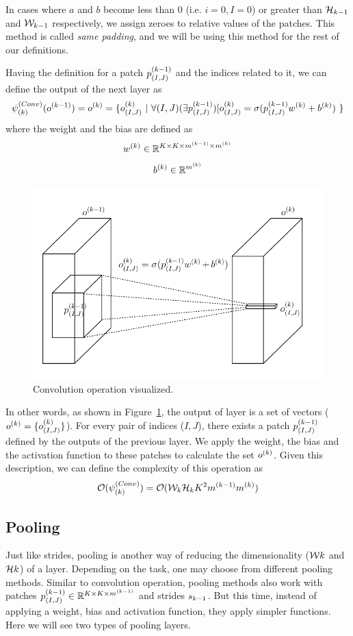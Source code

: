 In cases where $a$ and $b$ become less than 0 (i.e. $i=0, I=0$) or greater than $\mathcal{H}_{k-1}$ and $\mathcal{W}_{k-1}$ respectively, we assign zeroes to relative values of the patches. This method is called \textit{same padding}, and we will be using this method for the rest of our definitions. 

Having the definition for a patch $p^{(k-1)}_{(I,J)}$ and the indices related to it, we can define the output of the next layer as
$$\convk{k}(\ok{k-1}) = \ok{k} = \{\oki{k}{(I,J)} \ | \ \forall (I,J) (\exists \pki{k-1}{(I,J)}) [ \oki{k}{(I,J)} = \sigma(\pki{k-1}{(I,J)} \wk{k} + \bk{k})\ \}  $$
where the weight and the bias are defined as
$$ w^{(k)} \in \mathbb{R}^{K \times K \times m^{(k-1)} \times m^{(k)}} $$
$$ b^{(k)} \in \mathbb{R}^{m^{(k)}}$$
\begin{figure}[!h]
  \begin{centering}
    \includegraphics[width=1\textwidth]{images/convolution.pdf}
    \caption{Convolution operation visualized. }
    \label{fig:convolution}
  \end{centering}
\end{figure}
In other words, as shown in Figure~\ref{fig:convolution}, the output of layer is a set of vectors ($o^{(k)} = \{o^{(k)}_{(I,J)}\}$). For every pair of indices ($I,J$), there exists a patch $p^{(k-1)}_{(I,J)}$ defined by the outputs of the previous layer. We apply the weight, the bias and the activation function to these patches to calculate the set $o^{(k)}$. Given this description, we can define the complexity of this operation as
$$ \mathcal{O}(\psi^{(Conv)}_{(k)}) = \mathcal{O}(\mathcal{W}_{k}\mathcal{H}_{k}K^2m^{(k-1)}m^{(k)}) $$



\subsection{Pooling}
Just like strides, pooling is another way of reducing the dimensionality ($\mathcal{W}{k}$ and $\mathcal{H}{k}$) of a layer. Depending on the task, one may choose from different pooling methods. Similar to convolution operation, pooling methods also work with patches $p^{(k-1)}_{(I,J)} \in \mathbb{R}^{K \times K \times m^{(k-1)}}$ and strides $s_{k-1}$. But this time, instead of applying a weight, bias and activation function, they apply simpler functions. Here we will see two types of pooling layers.

